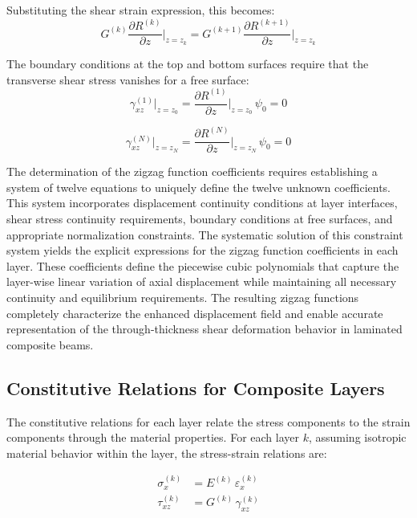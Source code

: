 \documentclass[12pt,a4paper]{report}
\begin{document}
Substituting the shear strain expression, this becomes:
\begin{equation}
G^{(k)} \frac{\partial R^{(k)}}{\partial z}\bigg|_{z=z_k} = 
G^{(k+1)} \frac{\partial R^{(k+1)}}{\partial z}\bigg|_{z=z_k}
\end{equation}

The boundary conditions at the top and bottom surfaces require that the transverse shear stress vanishes for a free surface:
\begin{equation}
\gamma_{xz}^{(1)}\bigg|_{z=z_0} = \frac{\partial R^{(1)}}{\partial z}\bigg|_{z=z_0} \, \psi_0 = 0
\end{equation}

\begin{equation}
\gamma_{xz}^{(N)}\bigg|_{z=z_N} = \frac{\partial R^{(N)}}{\partial z}\bigg|_{z=z_N} \, \psi_0 = 0
\end{equation}

The determination of the zigzag function coefficients requires establishing a system of twelve equations to uniquely define the twelve unknown coefficients. This system incorporates displacement continuity conditions at layer interfaces, shear stress continuity requirements, boundary conditions at free surfaces, and appropriate normalization constraints.
The systematic solution of this constraint system yields the explicit expressions for the zigzag function coefficients in each layer. These coefficients define the piecewise cubic polynomials that capture the layer-wise linear variation of axial displacement while maintaining all necessary continuity and equilibrium requirements. The resulting zigzag functions completely characterize the enhanced displacement field and enable accurate representation of the through-thickness shear deformation behavior in laminated composite beams.



\subsection{Constitutive Relations for Composite Layers}

The constitutive relations for each layer relate the stress components to the strain components through the material properties. For each layer $k$, assuming isotropic material behavior within the layer, the stress-strain relations are:

\begin{align}
\sigma_x^{(k)} &= E^{(k)} \, \varepsilon_x^{(k)} \\
\tau_{xz}^{(k)} &= G^{(k)} \, \gamma_{xz}^{(k)}
\end{align}
\end{document}
